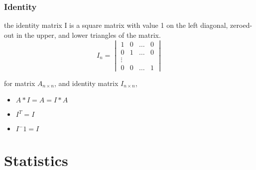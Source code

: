 \documentclass[4apaper,12pt]{book}
\begin{document}
\begin{description}
                    \subsection{Identity}
                \item the identity matrix I is a square matrix with value 1 on the left diagonal, zeroed-out in the upper, and lower triangles of the matrix.
                  \begin{equation} I_n=\begin{vmatrix}1&0&\dots&0\\0&1&\dots&0\\\vdots\\0&0&\dots&1\end{vmatrix} \end{equation}
                \item for matrix $A_{n\times n}$, and identity matrix $I_{n \times n}$,
                  \begin{itemize}
                  \item $A*I = A = I*A$
                  \item $I^T=I$
                  \item $I^-1=I$
                  \end{itemize}
  \end{description}
  \chapter{Statistics}
\end{document}
